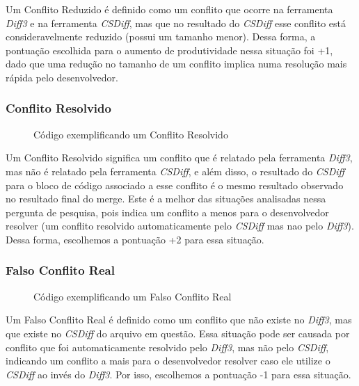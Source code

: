 Um Conflito Reduzido é definido como um conflito que ocorre na ferramenta
\emph{Diff3} e na ferramenta \emph{CSDiff}, mas que no resultado do
\emph{CSDiff} esse conflito está consideravelmente reduzido (possui um tamanho
menor). Dessa forma, a pontuação escolhida para o aumento de produtividade
nessa situação foi +1, dado que uma redução no tamanho de um conflito implica
numa resolução mais rápida pelo desenvolvedor.

\subsubsection{Conflito Resolvido}
\begin{figure}[ht]
	\begin{center}
		
		\caption{Código exemplificando um Conflito Resolvido}\label{conflito_resolvido}
	\end{center}
\end{figure}

Um Conflito Resolvido significa um conflito que é relatado pela ferramenta
\emph{Diff3}, mas não é relatado pela ferramenta \emph{CSDiff}, e além disso, o
resultado do \emph{CSDiff} para o bloco de código associado a esse conflito é o
mesmo resultado observado no resultado final do merge. Este é a melhor das
situações analisadas nessa pergunta de pesquisa, pois indica um conflito a
menos para o desenvolvedor resolver (um conflito resolvido automaticamente pelo
\emph{CSDiff} mas nao pelo \emph{Diff3}). Dessa forma, escolhemos a pontuação
+2 para essa situação.

\subsubsection{Falso Conflito Real}
\begin{figure}[ht]
	\begin{center}
		
		\caption{Código exemplificando um Falso Conflito Real}\label{falso_conflito_real}
	\end{center}
\end{figure}

Um Falso Conflito Real é definido como um conflito que não existe no
\emph{Diff3}, mas que existe no \emph{CSDiff} do arquivo em questão. Essa
situação pode ser causada por conflito que foi automaticamente resolvido pelo
\emph{Diff3}, mas não pelo \emph{CSDiff}, indicando um conflito a mais para o
desenvolvedor resolver caso ele utilize o \emph{CSDiff} ao invés do
\emph{Diff3}. Por isso, escolhemos a pontuação -1 para essa situação.

